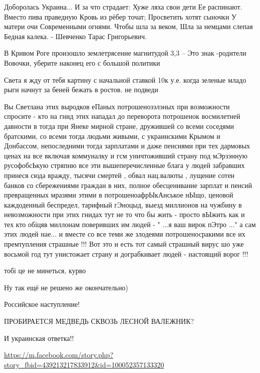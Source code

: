 \begin{multicols}{2}

\obeycr
Доборолась Украина...
И за что страдает:
Хуже ляха свои дети
Ее распинают.
Вместо пива праведную
Кровь из рёбер точат;
Просветить хотят сыночки
У матери очи
Современными огнями.
Чтобы шла за веком,
Шла за немцами слепая
Бедная калека.
-
Шевченко Тарас Григорьевич.
\restorecr


В Кривом Роге произошло землетрясение магнитудой 3,3
--
Это знак -родители Вовочки, уберите наконец его с большой политики

Света я жду от тебя картину с начальной ставкой 10к у.е. когда зеленые младо
рыги начнут за беней бежать в ростов. не подведи


Вы Светлана этих выродков еПаных потрошенозэлэных при возможности спросите -
кто на гнид этих нападал до переворота потрошенок восмилетней давности в тогда
при Янеке мирной стране, дружившей со всеми соседями братскими, со всеми
тогда людьми живыми, с украинскими Крымом и Донбассом, непоследними тогда
зарплатами и даже пенсиями при тех дармовых ценах на все включая коммуналку и
гсм уничтоживший страну под мЭрзэнную русофобсЬкую стряпню все эти
вышеперечисленные блага у людей забравших принеся сюда вражду, тысячи смертей
, обвал нац.валюты , лущение сотен банков со сбережениями граждан в них,
полное обесценивание зарплат и пенсий превращенных мразями этими в
потрошеноафрЫкАнськое нЫщо, ценовой каждоденный беспредел, тарифный гЭноцыд,
выезд миллионов на чужбину в невозможности при этих гнидах тут не то что бы
жить - просто вЫжить как и тех кто обіцяв миллонам поверивших им людей - " ...я
ваш вирок пЭтро ..." а сам этих людей нае... и вместе со все теми же злодеями
потрошеносракими все их премтупления страшные !!! Вот это и есть тот самый
страшный вирус шо уже восьмой год тут унистожает страну и дограбкивает людей -
настоящий ворог !!!

тобі це не минеться, курво

Ну так ещё не решено же окончательно)


Российское наступление!

ПРОБИРАЕТСЯ МЕДВЕДЬ СКВОЗЬ ЛЕСНОЙ ВАЛЕЖНИК?

И украинская ответка!!

\url{https://m.facebook.com/story.php?story_fbid=439213217833912&id=100052357133320}


\end{multicols}

